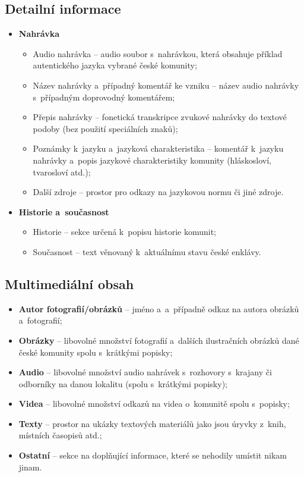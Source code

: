 \hypertarget{detailnuxed-informace}{%
\subsection{Detailní informace}\label{detailnuxed-informace}}

\begin{itemize}
\tightlist
\item
  \textbf{Nahrávka}

  \begin{itemize}
  \tightlist
  \item
    Audio nahrávka -- audio soubor s~nahrávkou, která obsahuje příklad autentického jazyka vybrané české komunity;
  \item
    Název nahrávky a~případný komentář ke vzniku -- název audio nahrávky s~případným doprovodný komentářem;
  \item
    Přepis nahrávky -- fonetická transkripce zvukové nahrávky do textové podoby (bez použití speciálních znaků);
  \item
    Poznámky k~jazyku a~jazyková charakteristika -- komentář k~jazyku nahrávky a~popis jazykové charakteristiky komunity (hláskosloví, tvarosloví atd.);
  \item
    Další zdroje -- prostor pro odkazy na jazykovou normu či jiné zdroje.
  \end{itemize}
\item
  \textbf{Historie a~současnost}

  \begin{itemize}
  \tightlist
  \item
    Historie -- sekce určená k~popisu historie komunit;
  \item
    Současnost -- text věnovaný k~aktuálnímu stavu české enklávy.
  \end{itemize}
\end{itemize}

\hypertarget{multimediuxe1lnuxed-obsah}{%
\subsection{Multimediální obsah}\label{multimediuxe1lnuxed-obsah}}

\begin{itemize}
\tightlist
\item
  \textbf{Autor fotografií/obrázků} -- jméno a~a~případně odkaz na autora obrázků a~fotografií;
\item
  \textbf{Obrázky} -- libovolné množství fotografií a~dalších ilustračních obrázků dané české komunity spolu s~krátkými popisky;
\item
  \textbf{Audio} -- libovolné množství audio nahrávek s~rozhovory s~krajany či odborníky na danou lokalitu (spolu s~krátkými popisky);
\item
  \textbf{Videa} -- libovolné množství odkazů na videa o~komunitě spolu s~popisky;
\item
  \textbf{Texty} -- prostor na ukázky textových materiálů jako jsou úryvky z~knih, místních časopisů atd.;
\item
  \textbf{Ostatní} -- sekce na doplňující informace, které se nehodily umístit nikam jinam.
\end{itemize}

